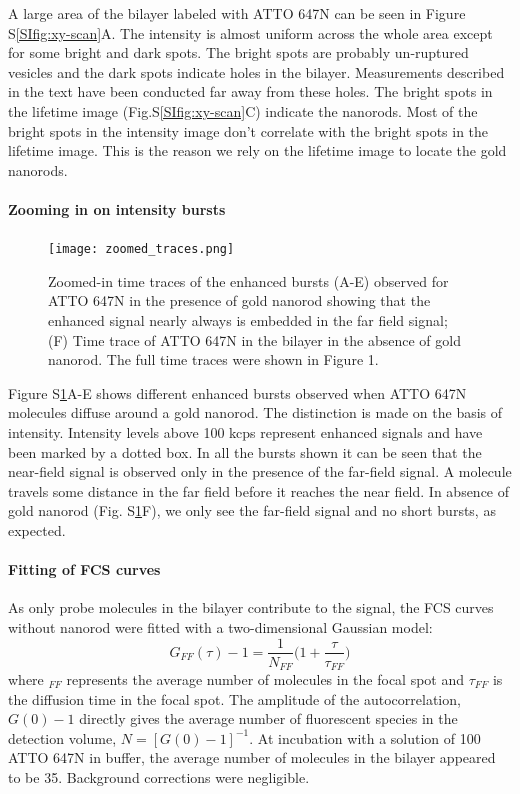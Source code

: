 A large area of the bilayer labeled with ATTO 647N can be seen in Figure S\ref{SIfig:xy-scan}A.
The intensity is almost uniform across the whole area except for some bright and dark spots.
The bright spots are probably un-ruptured vesicles and the dark spots indicate holes in the bilayer.
Measurements described in the text have been conducted far away from these holes.
The bright spots in the lifetime image (Fig.S\ref{SIfig:xy-scan}C) indicate the nanorods.
Most of the bright spots in the intensity image don't correlate with the bright spots in the lifetime image.
This is the reason we rely on the lifetime image to locate the gold nanorods.

\paragraph*{Zooming in on intensity bursts}
\begin{figure}%
  \centering
  \texttt{[image: zoomed\_traces.png]}
  \makeatletter
  \renewcommand{\fnum@figure}{\figurename~S\thefigure}
  \makeatother{}
  \caption{Zoomed-in time traces of the enhanced bursts (A-E) observed for ATTO 647N in the presence of gold nanorod showing that the enhanced signal nearly always is embedded in the far field signal; (F) Time trace of ATTO 647N in the bilayer in the absence of gold nanorod.
  The full time traces were shown in Figure 1.}
  \label{SIfig:zoomed-trace}
\end{figure}

Figure S\ref{SIfig:zoomed-trace}A-E shows different enhanced bursts observed when ATTO 647N molecules diffuse around a gold nanorod.
The distinction is made on the basis of intensity.
Intensity levels above 100 kcps represent enhanced signals and have been marked by a dotted box.
In all the bursts shown it can be seen that the near-field signal is observed only in the presence of the far-field signal.
A molecule travels some distance in the far field before it reaches the near field.
In absence of gold nanorod (Fig. S\ref{SIfig:zoomed-trace}F), we only see the far-field signal and no short bursts, as expected.
\paragraph*{Fitting of FCS curves}
As only probe molecules in the bilayer contribute to the signal, the FCS curves without nanorod were fitted with a two-dimensional Gaussian model:
\begin{equation}
  G_{FF}(\tau)-1 = \frac{1}{N_{FF}}\Bigg(1+\frac{\tau}{\tau_{FF}}\Bigg)
  \label{eq:2Dgauss}
\end{equation}
where $_{FF}$ represents the average number of molecules in the focal spot and $\tau_{FF}$ is the diffusion time in the focal spot.
The amplitude of the autocorrelation, $G(0)-1$ directly gives the average number of fluorescent species in the detection volume, $N=[G(0)-1]^{-1}$.
At incubation with a solution of \SI{100}{\nM} ATTO 647N in buffer, the average number of molecules in the bilayer appeared to be 35.
Background corrections were negligible.

